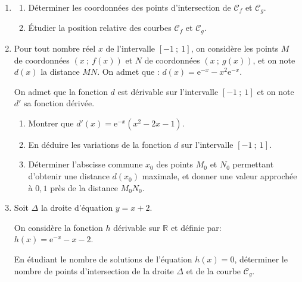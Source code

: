 \documentclass[10pt]{article}
\providecommand{\R}{\mathbb{R}}
\begin{document}
\begin{enumerate}
\item 
	\begin{enumerate}
		\item Déterminer les coordonnées des points d'intersection de $\mathcal{C}_f$ et $\mathcal{C}_g$.
		\item Étudier la position relative des courbes $\mathcal{C}_f$ et $\mathcal{C}_g$.
	\end{enumerate}
\item  Pour tout nombre réel $x$ de l'intervalle $[-1~;~1]$, on considère les points $M$ de coordonnées $(x~;~f(x))$ et $N$ de coordonnées $(x~;~g(x))$, et on note $d(x)$ la distance $MN$. On admet que : $d(x)= \text{e}^{-x} - x^2\text{e}^{-x}$.

On admet que la fonction $d$ est dérivable sur l'intervalle $[-1~;~1]$ et on note $d'$ sa fonction dérivée.
	\begin{enumerate}
		\item Montrer que $d'(x) = \text{e}^{-x}\left(x^2 - 2x - 1\right)$. 
		\item En déduire les variations de la fonction $d$ sur l'intervalle $[-1~;~1]$.
		\item Déterminer l'abscisse commune $x_0$ des points $M_0$ et $N_0$ permettant d'obtenir une
distance $d\left(x_0\right)$ maximale, et donner une valeur approchée à $0,1$ près de la distance $M_0N_0$.
	\end{enumerate}
\item  Soit $\Delta$ la droite d'équation $y = x + 2$.

On considère la fonction $h$ dérivable sur $\R$ et définie par: $h(x) = \text{e}^{-x} - x - 2$.

En étudiant le nombre de solutions de l'équation $h(x) = 0$, déterminer le nombre de points d'intersection de la droite $\Delta$ et de la courbe $\mathcal{C}_g$.
\end{enumerate}
\end{document}
